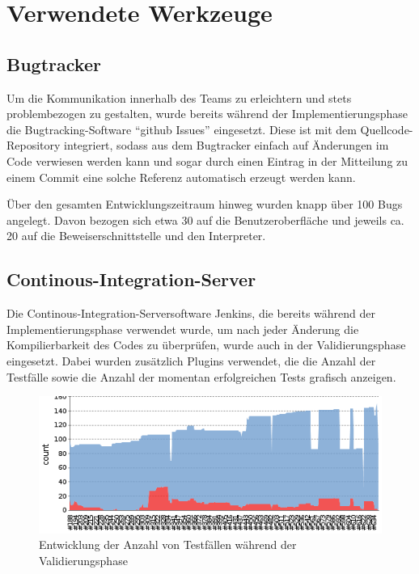 \section{Verwendete Werkzeuge}
\subsection{Bugtracker}
Um die Kommunikation innerhalb des Teams zu erleichtern und stets problembezogen zu gestalten, wurde bereits während der Implementierungsphase  die Bugtracking-Software ``github Issues'' eingesetzt. Diese ist mit dem Quellcode-Repository integriert, sodass aus dem Bugtracker einfach auf Änderungen im Code verwiesen werden kann und sogar durch einen Eintrag in der Mitteilung zu einem Commit eine solche Referenz automatisch erzeugt werden kann.

Über den gesamten Entwicklungszeitraum hinweg wurden knapp über 100 Bugs angelegt. Davon bezogen sich etwa 30 auf die Benutzeroberfläche und jeweils ca. 20 auf die Beweiserschnittstelle und den Interpreter.

\subsection{Continous-Integration-Server}
Die Continous-Integration-Serversoftware Jenkins, die bereits während der Implementierungsphase verwendet wurde, um nach jeder Änderung die Kompilierbarkeit des Codes zu überprüfen, wurde auch in der Validierungsphase eingesetzt. Dabei wurden zusätzlich Plugins verwendet, die die Anzahl der Testfälle sowie die Anzahl der momentan erfolgreichen Tests grafisch anzeigen.

\begin{center}
	\begin{figure}[h] %
		\includegraphics[width=13cm]{images/jenkins-test-trend.png}
		\caption{Entwicklung der Anzahl von Testfällen während der Validierungsphase}
	\end{figure}
\end{center}
